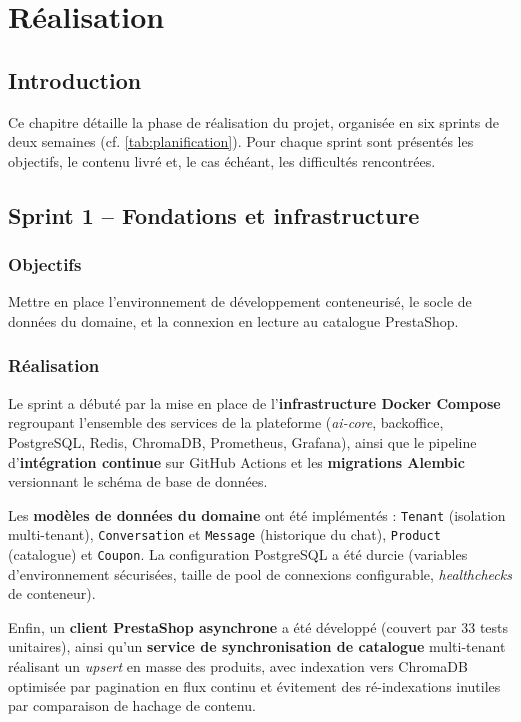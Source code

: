 \chapter{Réalisation}
\label{chap:realisation}

\section*{Introduction}

Ce chapitre détaille la phase de réalisation du projet, organisée en six sprints de deux semaines (cf. \cref{tab:planification}). Pour chaque sprint sont présentés les objectifs, le contenu livré et, le cas échéant, les difficultés rencontrées.

\section{Sprint 1 -- Fondations et infrastructure}

\subsection*{Objectifs}
Mettre en place l'environnement de développement conteneurisé, le socle de données du domaine, et la connexion en lecture au catalogue PrestaShop.

\subsection*{Réalisation}

Le sprint a débuté par la mise en place de l'\textbf{infrastructure Docker Compose} regroupant l'ensemble des services de la plateforme (\emph{ai-core}, backoffice, PostgreSQL, Redis, ChromaDB, Prometheus, Grafana), ainsi que le pipeline d'\textbf{intégration continue} sur GitHub Actions et les \textbf{migrations Alembic} versionnant le schéma de base de données.

Les \textbf{modèles de données du domaine} ont été implémentés : \texttt{Tenant} (isolation multi-tenant), \texttt{Conversation} et \texttt{Message} (historique du chat), \texttt{Product} (catalogue) et \texttt{Coupon}. La configuration PostgreSQL a été durcie (variables d'environnement sécurisées, taille de pool de connexions configurable, \emph{healthchecks} de conteneur).

Enfin, un \textbf{client PrestaShop asynchrone} a été développé (couvert par 33 tests unitaires), ainsi qu'un \textbf{service de synchronisation de catalogue} multi-tenant réalisant un \emph{upsert} en masse des produits, avec indexation vers ChromaDB optimisée par pagination en flux continu et évitement des ré-indexations inutiles par comparaison de hachage de contenu.


